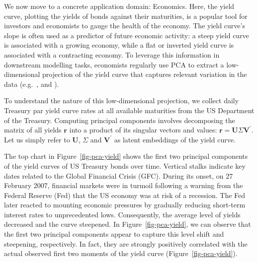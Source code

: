 \documentclass{article}
\theoremstyle{plain}
\theoremstyle{definition}
\theoremstyle{remark}
\begin{document}
We now move to a concrete application domain: Economics. Here, the yield curve, plotting the yields of bonds against their maturities, is a popular tool for investors and economists to gauge the health of the economy.
The yield curve's slope is often used as a predictor of future economic activity: a steep yield curve is associated with a growing economy, while a flat or inverted yield curve is associated with a contracting economy. %
To leverage this information in downstream modelling tasks, economists regularly use PCA to extract a low-dimensional projection of the yield curve that captures relevant variation in the data (e.g.\ \citet{berardi2022dissecting}, \citet{kumar2022effective} and \citet{crump2019deconstructing}).

To understand the nature of this low-dimensional projection, we collect daily Treasury par yield curve rates at all available maturities from the US Department of the Treasury. Computing principal components involves decomposing the matrix of all yields \(\mathbf{r}\) into a product of its singular vectors and values: \(\mathbf{r}=\mathbf{U}\Sigma\mathbf{V}^{\prime}\). Let us simply refer to \(\mathbf{U}\), \(\Sigma\) and \(\mathbf{V}^{\prime}\) as latent embeddings of the yield curve.

The top chart in Figure~\ref{fig-pca-yield} shows the first two principal components of the yield curves of US Treasury bonds over time. Vertical stalks indicate key dates related to the Global Financial Crisis (GFC). During its onset, on 27 February 2007, financial markets were in turmoil following a warning from the Federal Reserve (Fed) that the US economy was at risk of a recession. The Fed later reacted to mounting economic pressures by gradually reducing short-term interest rates to unprecedented lows. Consequently, the average level of yields decreased and the curve steepened. In Figure~\ref{fig-pca-yield}, we can observe that the first two principal components appear to capture this level shift and steepening, respectively. In fact, they are strongly positively correlated with the actual observed first two moments of the yield curve (Figure~\ref{fig-pca-yield}).
\end{document}
